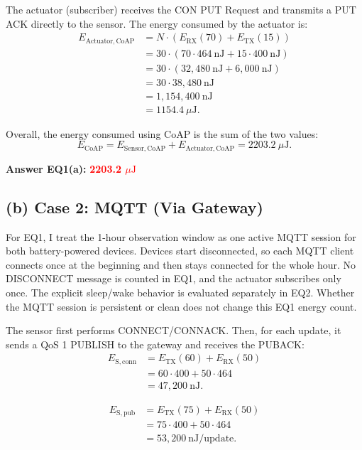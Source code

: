 \documentclass[a4paper,11pt]{article}
\newcommand{\answer}[1]{\textbf{\textcolor{red}{#1}}}
\newcommand{\tx}{\mathrm{TX}}
\newcommand{\rx}{\mathrm{RX}}
\newcommand{\uJ}{\mu\mathrm{J}}
\begin{document}
The actuator (subscriber) receives the CON PUT Request and transmits a PUT ACK directly to the sensor.
The energy consumed by the actuator is:
\[
\begin{aligned}
E_{\mathrm{Actuator,CoAP}}
  &= N \cdot \left(E_{\rx}(70) + E_{\tx}(15)\right) \\
  &= 30 \cdot (70 \cdot 464\ \mathrm{nJ} + 15 \cdot 400\ \mathrm{nJ}) \\
  &= 30 \cdot (32{,}480\ \mathrm{nJ} + 6{,}000\ \mathrm{nJ}) \\
  &= 30 \cdot 38{,}480\ \mathrm{nJ} \\
  &= 1{,}154{,}400\ \mathrm{nJ} \\
  &= 1154.4\ \uJ.
\end{aligned}
\]

Overall, the energy consumed using CoAP is the sum of the two values:
\[
  E_{\mathrm{CoAP}}
  = E_{\mathrm{Sensor,CoAP}} + E_{\mathrm{Actuator,CoAP}}
  = 2203.2\ \uJ.
\]

\textbf{Answer EQ1(a):} \answer{2203.2 $\mu\mathrm{J}$}

\subsection*{(b) Case 2: MQTT (Via Gateway)}
For EQ1, I treat the 1-hour observation window as one active MQTT session for
both battery-powered devices. Devices start disconnected, so each MQTT client
connects once at the beginning and then stays connected for the whole hour. No
DISCONNECT message is counted in EQ1, and the actuator subscribes only once. The
explicit sleep/wake behavior is evaluated separately in EQ2. Whether the MQTT
session is persistent or clean does not change this EQ1 energy count.

The sensor first performs CONNECT/CONNACK. Then, for each update, it sends a
QoS 1 PUBLISH to the gateway and receives the PUBACK:
\[
\begin{aligned}
E_{\mathrm{S,conn}}
  &= E_{\tx}(60) + E_{\rx}(50) \\
  &= 60 \cdot 400 + 50 \cdot 464 \\
  &= 47{,}200\ \mathrm{nJ}.
\end{aligned}
\]

\[
\begin{aligned}
E_{\mathrm{S,pub}}
  &= E_{\tx}(75) + E_{\rx}(50) \\
  &= 75 \cdot 400 + 50 \cdot 464 \\
  &= 53{,}200\ \mathrm{nJ/update}.
\end{aligned}
\]
\end{document}
